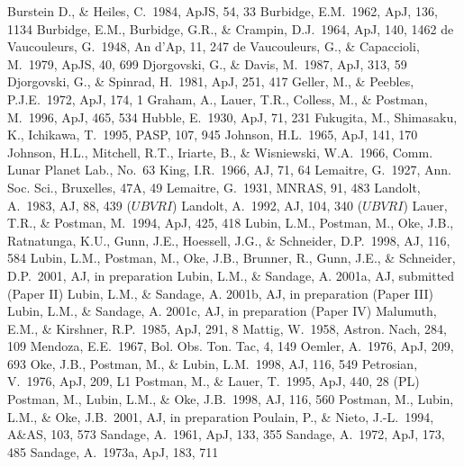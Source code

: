 \documentclass[preprint]{aastex}
\begin{document}
\newpage

\begin{thebibliography}{}

\bibitem[]{}Burstein D., \& Heiles, C.\ 1984, ApJS, 54, 33
\bibitem[]{}Burbidge, E.M.\ 1962, ApJ, 136, 1134 
\bibitem[]{}Burbidge, E.M., Burbidge, G.R., \& Crampin, D.J.\ 1964,
ApJ, 140, 1462
\bibitem[]{} de Vaucouleurs, G.\ 1948, An d'Ap, 11, 247
\bibitem[]{} de Vaucouleurs, G., \& Capaccioli, M.\ 1979, ApJS, 40, 699
\bibitem[]{} Djorgovski, G., \& Davis, M.\ 1987, ApJ, 313, 59
\bibitem[]{} Djorgovski, G., \& Spinrad, H.\ 1981, ApJ, 251, 417 
\bibitem[]{} Geller, M., \& Peebles, P.J.E.\ 1972, ApJ, 174, 1 
\bibitem[]{} Graham, A., Lauer, T.R., Colless, M., \& Postman, M.\ 1996, ApJ, 465, 534
\bibitem[]{} Hubble, E.\ 1930, ApJ, 71, 231
\bibitem[]{} Fukugita, M., Shimasaku, K., Ichikawa, T.\ 1995, PASP, 107, 945
\bibitem[]{} Johnson, H.L.\ 1965, ApJ, 141, 170
\bibitem[]{} Johnson, H.L., Mitchell, R.T., Iriarte, B., \& Wisniewski,
W.A.\ 1966, Comm. Lunar Planet Lab., No.\ 63
\bibitem[]{} King, I.R.\ 1966, AJ, 71, 64
\bibitem[]{} Lemaitre, G.\ 1927, Ann. Soc. Sci., Bruxelles, 47A, 49
\bibitem[]{} Lemaitre, G.\ 1931, MNRAS, 91, 483
\bibitem[]{} Landolt, A.\ 1983, AJ, 88, 439 ($UBVRI$) 
\bibitem[]{} Landolt, A.\  1992, AJ, 104, 340 ($UBVRI$)
\bibitem[]{} Lauer, T.R., \& Postman, M.\ 1994, ApJ, 425, 418
\bibitem[]{} Lubin, L.M., Postman, M., Oke, J.B., Ratnatunga, K.U.,
Gunn, J.E., Hoessell, J.G., \& Schneider, D.P.\ 1998, AJ, 116, 584
\bibitem[]{} Lubin, L.M., Postman, M., Oke, J.B., Brunner, R., Gunn,
J.E., \& Schneider, D.P.\ 2001, AJ, in preparation
\bibitem[]{} Lubin, L.M., \& Sandage, A. 2001a, AJ, submitted (Paper II)
\bibitem[]{} Lubin, L.M., \& Sandage, A. 2001b, AJ, in preparation (Paper III)
\bibitem[]{} Lubin, L.M., \& Sandage, A. 2001c, AJ, in preparation (Paper IV)
\bibitem[]{} Malumuth, E.M., \& Kirshner, R.P.\ 1985, ApJ, 291, 8
\bibitem[]{} Mattig, W.\ 1958, Astron. Nach, 284, 109
\bibitem[]{} Mendoza, E.E.\ 1967, Bol. Obs. Ton. Tac, 4, 149 
\bibitem[]{} Oemler, A.\ 1976, ApJ, 209, 693
\bibitem[]{} Oke, J.B., Postman, M., \& Lubin, L.M.\ 1998, AJ, 116, 549 
\bibitem[]{} Petrosian, V.\ 1976, ApJ, 209, L1
\bibitem[]{} Postman, M., \& Lauer, T.\ 1995, ApJ, 440, 28 (PL)
\bibitem[]{} Postman, M., Lubin, L.M., \& Oke, J.B.\ 1998, AJ, 116, 560
\bibitem[]{} Postman, M., Lubin, L.M., \& Oke, J.B.\ 2001, AJ, in preparation 
\bibitem[]{} Poulain, P., \& Nieto, J.-L.\ 1994, A\&AS, 103, 573
\bibitem[]{} Sandage, A.\ 1961, ApJ, 133, 355
\bibitem[]{} Sandage, A.\ 1972, ApJ, 173, 485  
\bibitem[]{} Sandage, A.\ 1973a, ApJ, 183, 711

\end{thebibliography}
\end{document}
